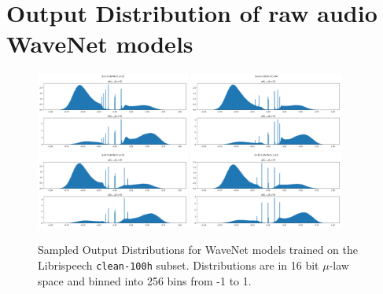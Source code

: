 \section{Output Distribution of raw audio WaveNet models}\label{appx:wavenet-output-distribution}
\begin{figure}[ht]
    \centering
    \includegraphics[width=0.45\textwidth]{gfx/S2_N5_L10_C64_output_distribution.png}
    \includegraphics[width=0.45\textwidth]{gfx/S4_N5_L10_C64_output_distribution.png}
    \includegraphics[width=0.45\textwidth]{gfx/S8_N5_L10_C64_output_distribution.png}
    \includegraphics[width=0.45\textwidth]{gfx/S16_N5_L10_C64_output_distribution.png}
    \caption{
    Sampled Output Distributions for WaveNet models trained on the Librispeech \texttt{clean-100h} subset.
    Distributions are in 16 bit $\mu$-law space and binned into 256 bins from -1 to 1.
    }
    \label{fig:wavenet-output-distributions}
\end{figure}


